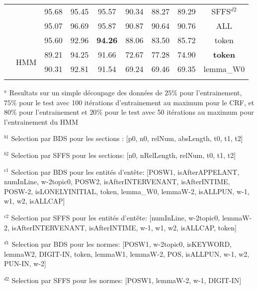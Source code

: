 \begin{table}[!h]
\begin{center}
\begin{tabular}{l|c|ccc|ccc|c}
				&  & 95.68 & 95.45 & 95.57 & 90.34 & 88.27 & 89.29 & SFFS$^{d2}$ \\ 
                &  & 95.07 & 96.69 & 95.87 & 90.87 & 90.64 & 90.76 & ALL \\
                &  & 95.60 & 92.96 & \textbf{94.26} & 88.06 & 83.50 & 85.72 & token \\ \cline{2-9}
                 &  \multirow{2}{*}{HMM} & 89.21 & 94.25 & 91.66 & 72.67 & 77.28 & 74.90 &  \textbf{token} \\ 
  &   & 90.31 & 92.81 & 91.54 & 69.24 & 69.46 & 69.35 &  lemma\_W0 \\ 
\noalign{\smallskip}\hline\noalign{\smallskip}
\end{tabular}
\end{center}

$^a$ Resultats sur un simple découpage des données de $25\%$ pour l'entrainement,  $75\%$ pour le test avec 100 itérations d'entrainement au maximum  pour le CRF, et $80\%$ pour l'entrainement et $20\%$ pour le test avec 50 itérations au maximum pour l'entrainement du HMM

$^{b1}$ Selection par BDS pour les sections : [p0, n0, relNum, absLength, t0, t1, t2]

$^{b2}$ Selection par SFFS pour les sections: [n0, nRelLength, relNum, t0, t1, t2]

 $^{c1}$ Selection par BDS pour les entités d'entête:  [POSW1, isAfterAPPELANT, numInLine, w-2topic0, POSW2, isAfterINTERVENANT, isAfterINTIME, POSW-2, isLONELYINITIAL, token, lemma\_W0, lemmaW-2, isALLPUN, w-1, w1, w2, isALLCAP]

$^{c2}$ Selection par SFFS pour les  entités d'entête: [numInLine, w-2topic0, lemmaW-2, isAfterINTERVENANT, isAfterINTIME, w-1, w1, w2, isALLCAP, token]

$^{d1}$ Selection par BDS pour les normes: [POSW1, w-2topic0, isKEYWORD, lemmaW2, DIGIT-IN, token, lemmaW1, lemmaW-2, POS, isALLPUN, w-1, w2, PUN-IN, w-2]

$^{d2}$ Selection par SFFS pour les normes: [POSW1, lemmaW-2, w-1, DIGIT-IN]
\end{table}



